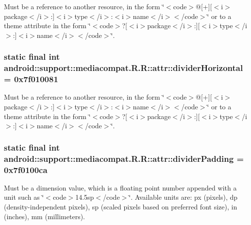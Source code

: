 Must be a reference to another resource, in the form \char`\"{}$<$code$>$@\mbox{[}+\mbox{]}\mbox{[}$<$i$>$package$<$/i$>$:\mbox{]}$<$i$>$type$<$/i$>$:$<$i$>$name$<$/i$>$$<$/code$>$\char`\"{} or to a theme attribute in the form \char`\"{}$<$code$>$?\mbox{[}$<$i$>$package$<$/i$>$:\mbox{]}\mbox{[}$<$i$>$type$<$/i$>$:\mbox{]}$<$i$>$name$<$/i$>$$<$/code$>$\char`\"{}. \hypertarget{classandroid_1_1support_1_1mediacompat_1_1_r_1_1attr_cf698437200c3c1ffc72f98e39ab3456}{
\subsubsection[{dividerHorizontal}]{\setlength{\rightskip}{0pt plus 5cm}static final int android::support::mediacompat.R.R::attr::dividerHorizontal = 0x7f010081}}
\label{classandroid_1_1support_1_1mediacompat_1_1_r_1_1attr_cf698437200c3c1ffc72f98e39ab3456}


Must be a reference to another resource, in the form \char`\"{}$<$code$>$@\mbox{[}+\mbox{]}\mbox{[}$<$i$>$package$<$/i$>$:\mbox{]}$<$i$>$type$<$/i$>$:$<$i$>$name$<$/i$>$$<$/code$>$\char`\"{} or to a theme attribute in the form \char`\"{}$<$code$>$?\mbox{[}$<$i$>$package$<$/i$>$:\mbox{]}\mbox{[}$<$i$>$type$<$/i$>$:\mbox{]}$<$i$>$name$<$/i$>$$<$/code$>$\char`\"{}. \hypertarget{classandroid_1_1support_1_1mediacompat_1_1_r_1_1attr_6c0b96c90e342d591842e162e5556d63}{
\subsubsection[{dividerPadding}]{\setlength{\rightskip}{0pt plus 5cm}static final int android::support::mediacompat.R.R::attr::dividerPadding = 0x7f0100ca}}
\label{classandroid_1_1support_1_1mediacompat_1_1_r_1_1attr_6c0b96c90e342d591842e162e5556d63}


Must be a dimension value, which is a floating point number appended with a unit such as \char`\"{}$<$code$>$14.5sp$<$/code$>$\char`\"{}. Available units are: px (pixels), dp (density-independent pixels), sp (scaled pixels based on preferred font size), in (inches), mm (millimeters). 


